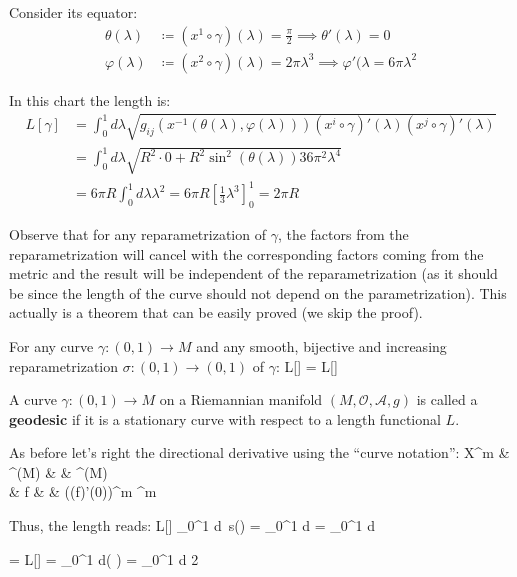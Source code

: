 Consider its equator:
\begin{align*}
\theta(\lambda) & \coloneqq (x^1 \circ \gamma)(\lambda) = \frac{\pi}{2} \implies \theta'(\lambda) = 0 \\
\varphi(\lambda) & \coloneqq (x^2 \circ \gamma)(\lambda) = 2\pi \lambda^3 \implies \varphi'(\lambda = 6\pi\lambda^2
\end{align*}

In this chart the length is:
\begin{align*}
L[\gamma] & = \int_0^1 d\lambda \sqrt{g_{ij}(x^{-1}(\theta(\lambda), \varphi(\lambda)))(x^i \circ \gamma)'
(\lambda)(x^j \circ \gamma)'(\lambda)} \\[5pt]
& = \int_0^1 d\lambda \sqrt{R^2 \cdot 0 + R^2\sin^2{(\theta(\lambda))} 36 \pi^2 \lambda^4} \\[5pt]
& = 6\pi R \int_0^1 d\lambda \lambda^2 = 6\pi R [\frac{1}{3} \lambda^3]^1_0 = 2\pi R
\end{align*}
\ee

Observe that for any reparametrization of $\gamma$, the factors from the reparametrization will cancel with the
corresponding factors coming from the metric and the result will be independent of the reparametrization (as it should
be since the length of the curve should not depend on the parametrization). This actually is a theorem that can be
easily proved (we skip the proof).

\bt[]
For any curve $\gamma : (0,1) \to M$ and any smooth, bijective and increasing reparametrization $\sigma :(0,1) \to
(0,1)$ of $\gamma$:
\bse
L[\gamma] = L[\gamma \circ \sigma]
\ese
\et

\bd [Geodesic]
A curve $\gamma : (0,1) \to M$ on a Riemannian manifold $(M, \mathcal{O}, \mathscr{A}, g)$ is called a
\textbf{geodesic} if it is a stationary curve with respect to a length functional $L$.
\ed

As before let's right the directional derivative using the ``curve notation'':
X^m \cl & ^\infty(M) & \xrightarrow{\sim} & ^\infty(M) \\
& f & \mapsto & ((f\circ\gamma)'(0))^m \coloneqq \dot{\gamma}^m
\ei

Thus, the length reads:
\bse
L[\gamma] \coloneqq \int_0^1 d\lambda \, s(\lambda) = \int_0^1 d\lambda {} =
\int_0^1 d\lambda {}
\ese

= \delta L[\gamma] = \int_0^1 d\lambda \cdot \delta \left( 
\right)
= \int_0^1 d\lambda \cdot {}
{2{}}
\ese

